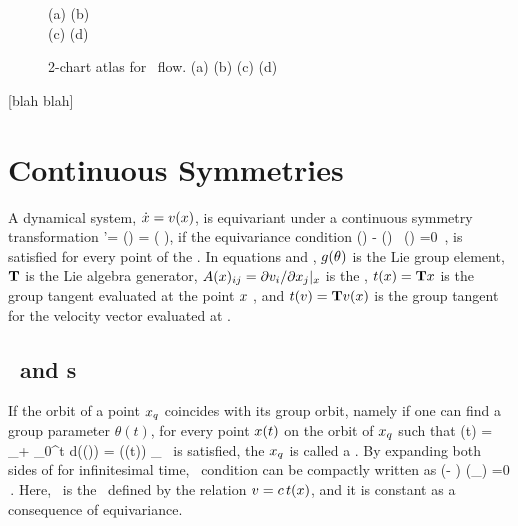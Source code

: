 \documentclass[aip,cha,
reprint,
secnumarabic,
nofootinbib, tightenlines,
nobibnotes, showkeys, showpacs,
groupedaddress,
]{revtex4-1}
\begin{document}
\begin{figure}
 \begin{center}
 \setlength{\unitlength}{0.20\textwidth}
(a)
(b)
\\
(c)
(d)
 \end{center}
    \caption{
2-chart atlas for \twoMode\ flow.
(a)
(b)
(c)
(d)
    }
\label{fig:2modeSects}
\end{figure}

 [blah blah]

\section{Continuous Symmetries}
\label{s:symm}

A dynamical system, $\dot{x}=v(x)$, is equivariant under a continuous
symmetry transformation
\beq
	\ssp'= \LieEl (\theta) \ssp = \exp\left( \theta \Lg\right)\ssp, 
if the equivariance condition 
\beq
  \groupTan(\vel)  - \Mvar(\ssp) \, \groupTan(\ssp) =0
  \,,
is satisfied for every point of the \statesp . In equations  and ,  
$g (\theta)$ is the Lie group element, $\mathbf{T}$ is the Lie algebra generator, 
$A(x)_{ij} = {\partial v_i}/{\partial x_j} |_x$  is the \stabmat ,  
$ t(x) = \mathbf{T} x $ is the group tangent evaluated at the point $x$ ,
and $ t(v) = \mathbf{T} v(x) $ is the group tangent for the velocity
vector evaluated at \ssp .

\subsection{\Reqva\ and \rpo s}
\label{s:relatives} 

If the orbit of a point $x_q$ coincides with its group orbit, 
namely if one can find a group parameter $\theta (t)$, for every point $x (t)$ 
on the orbit of $x_q$ such that
\beq
  \ssp (t) = \ssp_\stagn + \int_0^t d\tau \vel(\ssp (\tau)) = \LieEl (\theta (t)) \ssp_\stagn
  \,
is satisfied, the $x_q$ is called a \reqv . By expanding both sides of  
for infinitesimal time, \reqv\ condition can be compactly written as  
\beq
(\velRel \Lg - \Mvar ) \vel (\ssp_\stagn) =0
\,.
Here, \velRel\ is the \phaseVel\ defined by the relation $v = c \, t(x)$,
and it is constant as a consequence of equivariance.
\end{document}
